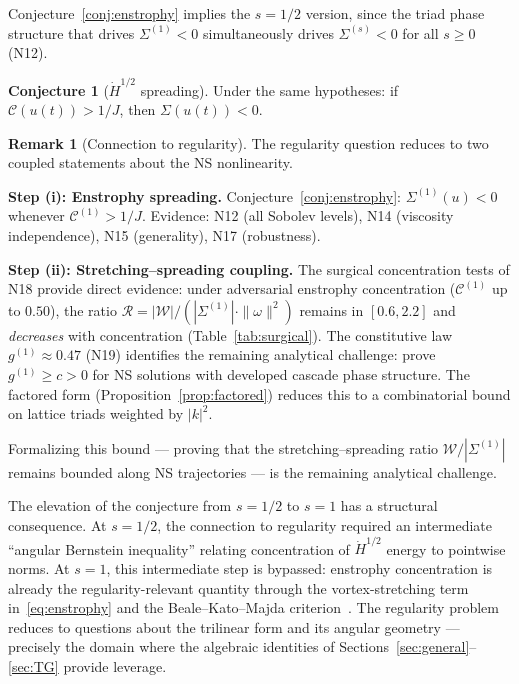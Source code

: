 \documentclass[11pt]{article}
\theoremstyle{definition}
\newtheorem{remark}[theorem]{Remark}
\newtheorem{conjecture}[theorem]{Conjecture}
\newcommand{\Hdot}[1]{\dot{H}^{#1}}
\newcommand{\cC}{\mathcal{C}}
\begin{document}
Conjecture~\ref{conj:enstrophy} implies the $s=1/2$
version, since the triad phase structure that drives
$\Sigma^{(1)}<0$ simultaneously drives
$\Sigma^{(s)}<0$ for all $s\geq 0$ (N12).

\begin{conjecture}[$\Hdot{1/2}$ spreading]
\label{conj:main}
Under the same hypotheses: if $\cC(u(t))>1/J$,
then $\Sigma(u(t))<0$.
\end{conjecture}

\begin{remark}[Connection to regularity]
\label{rem:regularity-final}
The regularity question reduces to two coupled
statements about the NS nonlinearity.

\smallskip\noindent\textbf{Step (i): Enstrophy
spreading.}
Conjecture~\ref{conj:enstrophy}:
$\Sigma^{(1)}(u)<0$ whenever $\cC^{(1)}>1/J$.
Evidence: N12 (all Sobolev levels), N14 (viscosity
independence), N15 (generality), N17 (robustness).

\smallskip\noindent\textbf{Step (ii):
Stretching--spreading coupling.}
The surgical concentration tests of N18 provide
direct evidence: under adversarial enstrophy
concentration ($\cC^{(1)}$ up to $0.50$), the ratio
$\mathcal{R} = |\mathcal{W}|/(|\Sigma^{(1)}|
\cdot\|\omega\|^2)$ remains in $[0.6, 2.2]$ and
\emph{decreases} with concentration
(Table~\ref{tab:surgical}).  The constitutive law
$g^{(1)}\approx 0.47$ (N19) identifies the remaining
analytical challenge: prove $g^{(1)}\geq c > 0$ for NS
solutions with developed cascade phase structure.
The factored form (Proposition~\ref{prop:factored})
reduces this to a combinatorial bound on lattice
triads weighted by $|k|^2$.

Formalizing this bound --- proving that the
stretching--spreading ratio $\mathcal{W}/|\Sigma^{(1)}|$
remains bounded along NS trajectories --- is the
remaining analytical challenge.
\end{remark}

The elevation of the conjecture from $s=1/2$ to $s=1$
has a structural consequence.  At $s=1/2$, the
connection to regularity required an intermediate
``angular Bernstein inequality'' relating concentration
of $\Hdot{1/2}$ energy to pointwise norms.  At $s=1$,
this intermediate step is bypassed: enstrophy
concentration is already the regularity-relevant
quantity through the vortex-stretching term
in~\eqref{eq:enstrophy} and the Beale--Kato--Majda
criterion~\cite{BKM}.  The regularity problem
reduces to questions about the trilinear form and its
angular geometry --- precisely the domain where the
algebraic identities of
Sections~\ref{sec:general}--\ref{sec:TG} provide
leverage.
\end{document}
